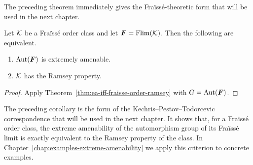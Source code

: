 The preceding theorem immediately gives the Fraïssé-theoretic form that will be used in the next chapter.

\begin{corollary}
    \label{cor:fraisse-order-class-ea}
    Let \(\mathcal{K}\) be a Fraïssé order class and let \(\boldsymbol{F}=\operatorname{Flim}(\mathcal{K})\).
    Then the following are equivalent.
    \begin{enumerate}
        \item[(i)] \(\operatorname{Aut}(\boldsymbol{F})\) is extremely amenable.
        \item[(ii)] \(\mathcal{K}\) has the Ramsey property.
    \end{enumerate}
\end{corollary}

\begin{proof}
    Apply Theorem~\ref{thm:ea-iff-fraisse-order-ramsey} with \(G=\operatorname{Aut}(\boldsymbol{F})\).
\end{proof}

The preceding corollary is the form of the Kechris--Pestov--Todorcevic correspondence that will be used in the next chapter. It shows that, for a Fraïssé order class, the extreme amenability of the automorphism group of its Fraïssé limit is exactly equivalent to the Ramsey property of the class. In Chapter~\ref{chap:examples-extreme-amenability} we apply this criterion to concrete examples.
